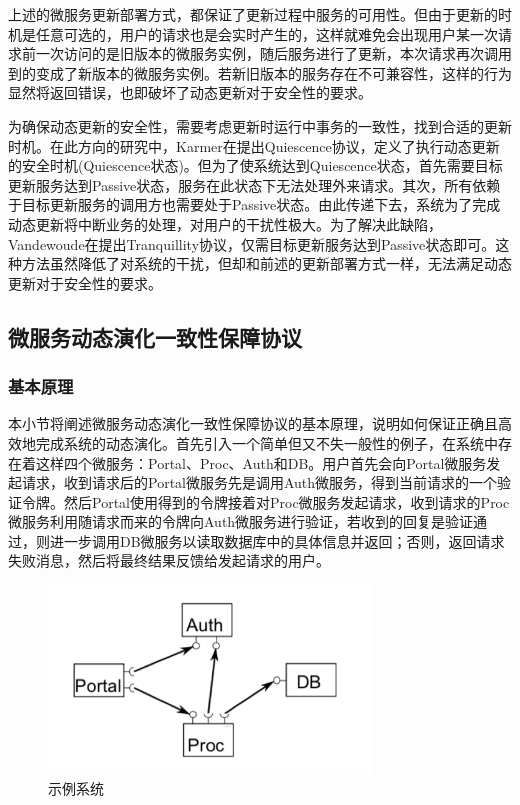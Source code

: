 \documentclass[a4paper]{article}
\theoremstyle{definition}
\begin{document}
上述的微服务更新部署方式，都保证了更新过程中服务的可用性。但由于更新的时机是任意可选的，用户的请求也是会实时产生的，这样就难免会出现用户某一次请求前一次访问的是旧版本的微服务实例，随后服务进行了更新，本次请求再次调用到的变成了新版本的微服务实例。若新旧版本的服务存在不可兼容性，这样的行为显然将返回错误，也即破坏了动态更新对于安全性的要求。

为确保动态更新的安全性，需要考虑更新时运行中事务的一致性，找到合适的更新时机。在此方向的研究中，Karmer在提出Quiescence协议，定义了执行动态更新的安全时机(Quiescence状态)。但为了使系统达到Quiescence状态，首先需要目标更新服务达到Passive状态，服务在此状态下无法处理外来请求。其次，所有依赖于目标更新服务的调用方也需要处于Passive状态。由此传递下去，系统为了完成动态更新将中断业务的处理，对用户的干扰性极大。为了解决此缺陷，Vandewoude在提出Tranquillity协议，仅需目标更新服务达到Passive状态即可。这种方法虽然降低了对系统的干扰，但却和前述的更新部署方式一样，无法满足动态更新对于安全性的要求。

\newpage
\subsection{微服务动态演化一致性保障协议}\label{section:version_consistency}

\subsubsection{基本原理}
本小节将阐述微服务动态演化一致性保障协议的基本原理，说明如何保证正确且高效地完成系统的动态演化。首先引入一个简单但又不失一般性的例子，在系统中存在着这样四个微服务：Portal、Proc、Auth和DB。用户首先会向Portal微服务发起请求，收到请求后的Portal微服务先是调用Auth微服务，得到当前请求的一个验证令牌。然后Portal使用得到的令牌接着对Proc微服务发起请求，收到请求的Proc微服务利用随请求而来的令牌向Auth微服务进行验证，若收到的回复是验证通过，则进一步调用DB微服务以读取数据库中的具体信息并返回；否则，返回请求失败消息，然后将最终结果反馈给发起请求的用户。
\begin{figure}[ht]
 \centering
 \includegraphics[height=5cm]{images/Example.png}
 \caption{示例系统}
 \label{fig:Example}
\end{figure}
\end{document}
